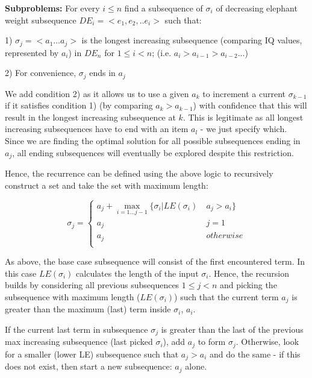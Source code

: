 \documentclass[11pt, a4paper]{article}
\begin{document}
\vspace{2mm}

\textbf{Subproblems:} For every $i \le n$ find a subsequence of $\sigma_i$ of decreasing elephant weight subsequence $DE_i = <e_1, e_2, .. e_i>$ such that:

1) $\sigma_j = <a_1 \dots a_j >$ is the longest increasing subsequence (comparing IQ values, represented by $a_i$)  in $DE_n$ for $1 \le i < n$; (i.e. $a_i > a_{i-1} > a_{i-2} \dots$)

 2) For convenience, $\sigma_j$ ends in $a_j$

\vspace{2mm}

 We add condition 2) as it allows us to use  a given $a_k$ to increment a current $\sigma_{k-1}$ if it satisfies condition 1) (by comparing $a_k > a_{k-1}$) with confidence that this will result in the longest increasing subsequence at $k$. This is legitimate as all longest increasing subsequences have to end with an item $a_l$ - we just specify which. Since we are finding the optimal solution for all possible subsequences ending in $a_j$, all ending subsequences will eventually be explored despite this restriction.

 Hence, the recurrence can be defined using the above logic to recursively construct a set and take the set with maximum length:

\[ \sigma_j = \begin{cases}
    a_j + \max \limits_{i = 1 \dots j-1}  \{\sigma_i | LE(\sigma_i)\ & a_j > a_i \} \\
        a_j & j = 1 \\
        a_j & otherwise \\
        \end{cases}
\]

As above, the base case subsequence will consist of the first encountered term. 
In this case $LE(\sigma_i)$ calculates the length of the input $\sigma_i$. Hence, the recursion builds by considering all previous subsequences $ 1 \le j < n$ and picking the subsequence with maximum length ($LE(\sigma_i)$) such that the current term $a_j$ is greater than the maximum (last) term inside $\sigma_i$, $a_i$. 

If the current last term in subsequence $\sigma_j$ is greater than the last of the previous max increasing subsequence (last picked $\sigma_i$), add $a_j$ to form $\sigma_j$. 
Otherwise, look for a smaller (lower LE) subsequence such that $a_j > a_i$ and do the same - if this does not exist, then start a new subsequence: $a_j$ alone.
\end{document}
